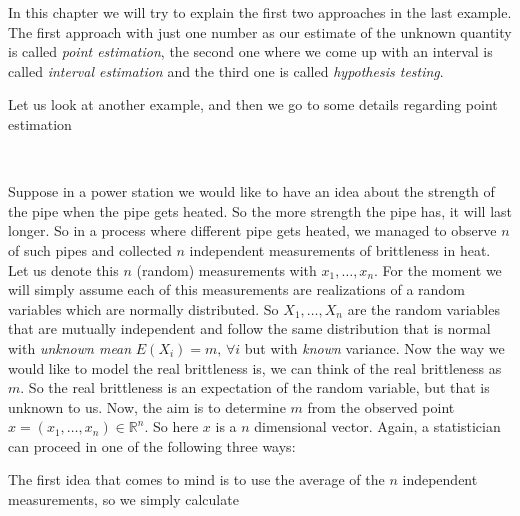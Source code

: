 \documentclass[ 11pt,%
				a4paper,%
				twoside,%
				headinclude,%
				footinclude = true,%
				cleardoublepage = empty,%
				reqno]{scrbook}
\begin{document}
In this chapter we will try to explain the first two approaches in the last example. The first approach with just one number as our estimate of the unknown quantity is called \emph{point estimation}, the second one where we come up with an interval is called \emph{interval estimation} and the third one is called \emph{hypothesis testing}. 

Let us look at another example, and then we go to some details regarding point estimation


\begin{example}~\label{ex:pipestrength}

Suppose in a power station we would like to have an idea about the strength of the pipe when the pipe gets heated. So the more strength the pipe has, it will last longer. So in a process where different pipe gets heated, we managed to observe $n$ of such pipes and collected $n$ independent measurements of brittleness in heat. Let us denote this $n$ (random) measurements with $x_{1}, \ldots, x_{n}$. For the moment we will simply assume each of this measurements are realizations of a random variables which are normally distributed. So $X_1, \ldots, X_n$ are the random variables that are mutually independent and follow the same distribution that is normal with \emph{unknown mean} $E(X_i) = m, \, \forall i$ but with \emph{known} variance. Now the way we would like to model the real brittleness is, we can think of the real brittleness as $m$. So the real brittleness is an expectation of the random variable, but that is unknown to us. Now, the aim is to determine $m$ from the observed point $x=\left(x_{1}, \ldots, x_{n}\right) \in \mathbb{R}^{n}$. So here $x$ is a $n$ dimensional vector. Again, a statistician can proceed in one of the following three ways:


\textbf{}

     The first idea that comes to mind is to use the average of the $n$ independent measurements, so we simply calculate


\end{example}
\end{document}
